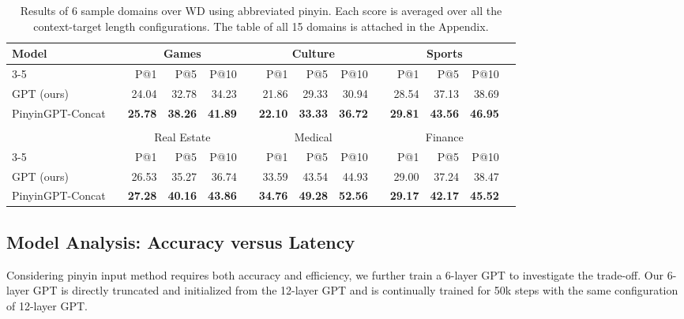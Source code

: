 \begin{table*}[!htp]
\centering
\small
\begin{tabular}{lrrrrrrrrrrrrr}\toprule
\multirow{3}{*}{Model} & &\multicolumn{3}{c}{Games} & &\multicolumn{3}{c}{Culture} & &\multicolumn{3}{c}{Sports} \\\cmidrule{3-5}\cmidrule{7-9}\cmidrule{11-13}
& &P@1 &P@5 &P@10 & &P@1 &P@5 &P@10 & &P@1 &P@5 &P@10 \\\midrule
GPT (ours) & &24.04 &32.78 &34.23 & &21.86 &29.33 &30.94 & &28.54 &37.13 &38.69 \\
PinyinGPT-Concat & &\textbf{25.78} &\textbf{38.26} &\textbf{41.89} &\textbf{} &\textbf{22.10} &\textbf{33.33} &\textbf{36.72} & &\textbf{29.81} &\textbf{43.56} &\textbf{46.95} \\
& & & & & & & & & & & & \\
& &\multicolumn{3}{c}{Real Estate} & &\multicolumn{3}{c}{Medical} & &\multicolumn{3}{c}{Finance} \\\cmidrule{3-5}\cmidrule{7-9}\cmidrule{11-13}
& &P@1 &P@5 &P@10 & &P@1 &P@5 &P@10 & &P@1 &P@5 &P@10 \\\midrule
GPT (ours) & &26.53 &35.27 &36.74 & &33.59 &43.54 &44.93 & &29.00 &37.24 &38.47 \\
PinyinGPT-Concat & &\textbf{27.28} &\textbf{40.16} &\textbf{43.86} &\textbf{} &\textbf{34.76} &\textbf{49.28} &\textbf{52.56} &\textbf{} &\textbf{29.17} &\textbf{42.17} &\textbf{45.52} \\
\bottomrule
\end{tabular}
\caption{Results of 6 sample domains over WD using abbreviated pinyin. Each score is averaged over all the context-target length configurations. The table of all 15 domains is attached in the Appendix.}
\label{tab:domain-sample}
\end{table*} 

\subsection{Model Analysis: Accuracy versus Latency}
Considering pinyin input method requires both accuracy and efficiency, we further train a 6-layer GPT to investigate the trade-off.
Our 6-layer GPT is directly truncated and initialized from the 12-layer GPT and is continually trained for 50k steps with the same configuration of 12-layer GPT.


